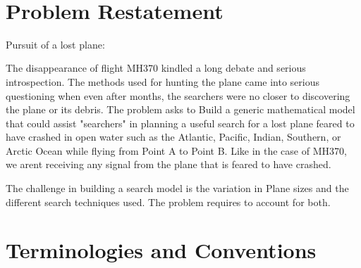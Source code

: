 \documentclass[12pt, letterpaper]{article}  %
\theoremstyle{definition}
\theoremstyle{remark}
\theoremstyle{plain}
\begin{document}
\newpage



   \doublespacing


\tableofcontents
\ \\

\newpage

\setcounter{page}{1}   




\section{Problem Restatement}\label{sec:restate}


Pursuit of a lost plane:

The disappearance of flight MH370 kindled a long debate and serious introspection. The methods used for hunting the plane came into serious questioning when even after months, the searchers were no closer to discovering the plane or its debris. 
The problem asks to Build a generic mathematical model that could assist "searchers" in planning a useful search for a lost plane feared to have crashed in open water such as the Atlantic, Pacific, Indian, Southern, or Arctic Ocean while flying from Point A to Point B. Like in the case of MH370, we arent receiving any signal from the plane that is feared to have crashed. 

The challenge in building a search model is the variation in Plane sizes and the different search techniques used. The problem requires to account for both.


\section{Terminologies and Conventions}\label{sec:terms}
\end{document}
